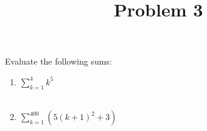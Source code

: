 \documentclass{ximera}
\title[Problem 3]{Problem 3}
\begin{document}
\begin{abstract} \end{abstract}
\maketitle

\begin{problem}
  Evaluate the following sums:
  \begin{enumerate}
  \item $\displaystyle \sum_{k=1}^{4} k^5 $ \\ \\

\item $\displaystyle \sum_{k=1}^{400} (5(k+1)^2 + 3) $
    
\end{enumerate}
\end{problem}
\end{document}
